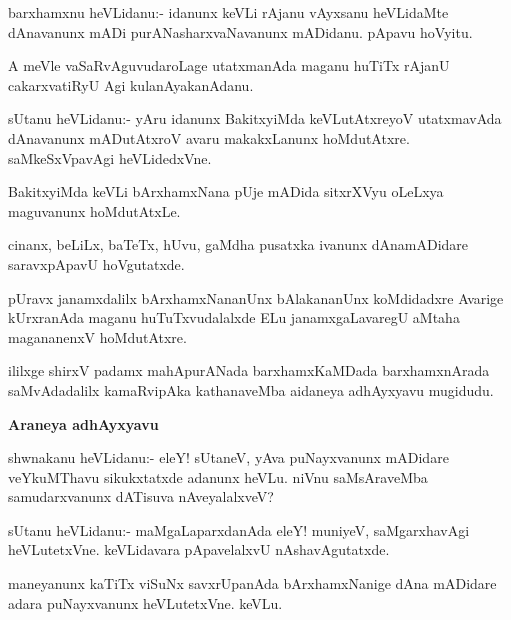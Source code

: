 \begin{mng}
barxhamxnu heVLidanu:- idanunx keVLi rAjanu vAyxsanu heVLidaMte dAnavanunx mADi purANasharxvaNavanunx mADidanu. pApavu hoVyitu.
\end{mng}

\begin{mng}
A meVle vaSaRvAguvudaroLage utatxmanAda maganu huTiTx rAjanU cakarxvatiRyU Agi kulanAyakanAdanu.
\end{mng}

\begin{mng}
sUtanu heVLidanu:- yAru idanunx BakitxyiMda keVLutAtxreyoV utatxmavAda dAnavanunx mADutAtxroV avaru makakxLanunx hoMdutAtxre. saMkeSxVpavAgi heVLidedxVne.
\end{mng}

\begin{mng}
BakitxyiMda keVLi bArxhamxNana pUje mADida sitxrXVyu oLeLxya maguvanunx hoMdutAtxLe.
\end{mng}

\begin{mng}
cinanx, beLiLx, baTeTx, hUvu, gaMdha pusatxka ivanunx dAnamADidare saravxpApavU hoVgutatxde.
\end{mng}

\begin{mng}
pUravx janamxdalilx bArxhamxNananUnx bAlakananUnx koMdidadxre Avarige kUrxranAda maganu huTuTxvudalalxde ELu janamxgaLavaregU aMtaha magananenxV hoMdutAtxre.
\end{mng}
ililxge shirxV padamx mahApurANada barxhamxKaMDada barxhamxnArada saMvAdadalilx kamaRvipAka kathanaveMba aidaneya adhAyxyavu mugidudu.

\begin{center}
\textbf{\Large Araneya adhAyxyavu}
\end{center}

\begin{mng}
shwnakanu heVLidanu:- eleY! sUtaneV, yAva puNayxvanunx mADidare veYkuMThavu sikukxtatxde adanunx heVLu. niVnu saMsAraveMba samudarxvanunx dATisuva nAveyalalxveV?
\end{mng}

\begin{mng}
sUtanu heVLidanu:- maMgaLaparxdanAda eleY! muniyeV, saMgarxhavAgi heVLutetxVne. keVLidavara pApavelalxvU nAshavAgutatxde.
\end{mng}

\begin{mng}
maneyanunx kaTiTx viSuNx savxrUpanAda bArxhamxNanige dAna mADidare adara puNayxvanunx heVLutetxVne. keVLu.
\end{mng}

